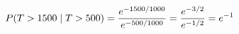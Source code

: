 \documentclass[preview]{standalone}
\begin{document}
\begin{align*}
\special{dvisvgm:raw <g id='unique000'>}P(T>1500\mid T>500)=\frac{e^{-1500/1000}}{e^{-500/1000}}=\frac{e^{-3/2}}{e^{-1/2}}=e^{-1}\special{dvisvgm:raw </g>}
\end{align*}
\end{document}
